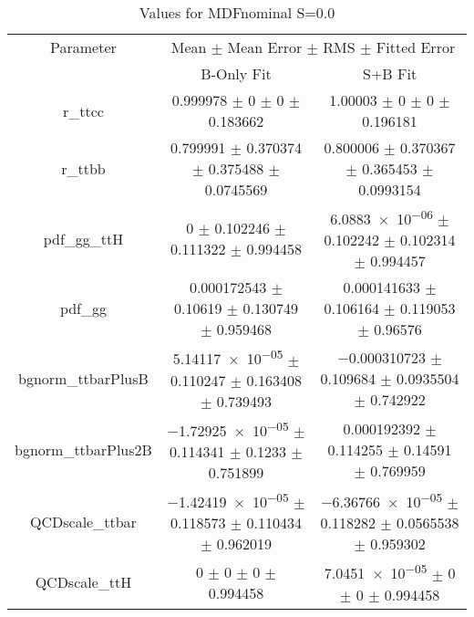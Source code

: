\begin{table}
\centering
\caption{Values for MDFnominal S=0.0}
\begin{tabular}{ccc}
\toprule
Parameter & \multicolumn{2}{c}{Mean $\pm$ Mean Error $\pm$ RMS $\pm$ Fitted Error}\\
 & B-Only Fit & S+B Fit\\
\midrule
r\_ttcc & \num{0.999978} $\pm$ \num{0} $\pm$ \num{0} $\pm$ \num{0.183662} & \num{1.00003} $\pm$ \num{0} $\pm$ \num{0} $\pm$ \num{0.196181}\\
r\_ttbb & \num{0.799991} $\pm$ \num{0.370374} $\pm$ \num{0.375488} $\pm$ \num{0.0745569} & \num{0.800006} $\pm$ \num{0.370367} $\pm$ \num{0.365453} $\pm$ \num{0.0993154}\\
pdf\_gg\_ttH & \num{0} $\pm$ \num{0.102246} $\pm$ \num{0.111322} $\pm$ \num{0.994458} & \num{6.0883e-06} $\pm$ \num{0.102242} $\pm$ \num{0.102314} $\pm$ \num{0.994457}\\
pdf\_gg & \num{0.000172543} $\pm$ \num{0.10619} $\pm$ \num{0.130749} $\pm$ \num{0.959468} & \num{0.000141633} $\pm$ \num{0.106164} $\pm$ \num{0.119053} $\pm$ \num{0.96576}\\
bgnorm\_ttbarPlusB & \num{5.14117e-05} $\pm$ \num{0.110247} $\pm$ \num{0.163408} $\pm$ \num{0.739493} & \num{-0.000310723} $\pm$ \num{0.109684} $\pm$ \num{0.0935504} $\pm$ \num{0.742922}\\
bgnorm\_ttbarPlus2B & \num{-1.72925e-05} $\pm$ \num{0.114341} $\pm$ \num{0.1233} $\pm$ \num{0.751899} & \num{0.000192392} $\pm$ \num{0.114255} $\pm$ \num{0.14591} $\pm$ \num{0.769959}\\
QCDscale\_ttbar & \num{-1.42419e-05} $\pm$ \num{0.118573} $\pm$ \num{0.110434} $\pm$ \num{0.962019} & \num{-6.36766e-05} $\pm$ \num{0.118282} $\pm$ \num{0.0565538} $\pm$ \num{0.959302}\\
QCDscale\_ttH & \num{0} $\pm$ \num{0} $\pm$ \num{0} $\pm$ \num{0.994458} & \num{7.0451e-05} $\pm$ \num{0} $\pm$ \num{0} $\pm$ \num{0.994458}\\
\bottomrule
\end{tabular}
\end{table}